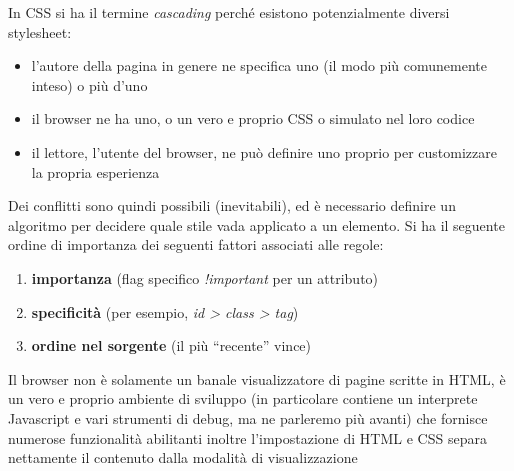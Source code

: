 \documentclass[a4paper,12pt, oneside]{book}
\begin{document}
In CSS si ha il termine \textit{cascading} perché esistono potenzialmente diversi stylesheet:
\begin{itemize}
\item l'autore della pagina in genere ne specifica uno (il modo più comunemente inteso) o più d'uno
\item il browser ne ha uno, o un vero e proprio CSS o simulato nel loro codice
\item il lettore, l’utente del browser, ne può definire uno proprio per customizzare la propria esperienza
\end{itemize}
Dei conflitti sono quindi possibili (inevitabili), ed è necessario definire un algoritmo per decidere quale stile vada applicato a un elemento. Si ha il seguente ordine di importanza dei seguenti fattori associati alle regole:
\begin{enumerate}
\item \textbf{importanza} (flag specifico \textit{!important} per un attributo)
\item \textbf{specificità} (per esempio, \textit{id > class > tag})
\item \textbf{ordine nel sorgente }(il più “recente” vince)
\end{enumerate}
Il browser non è solamente un banale visualizzatore di pagine
scritte in HTML, è un vero e proprio ambiente di sviluppo (in
particolare contiene un interprete Javascript e vari strumenti di debug, ma ne parleremo più avanti) che fornisce numerose funzionalità abilitanti inoltre l'impostazione di HTML e CSS separa nettamente il contenuto
dalla modalità di visualizzazione
\end{document}
